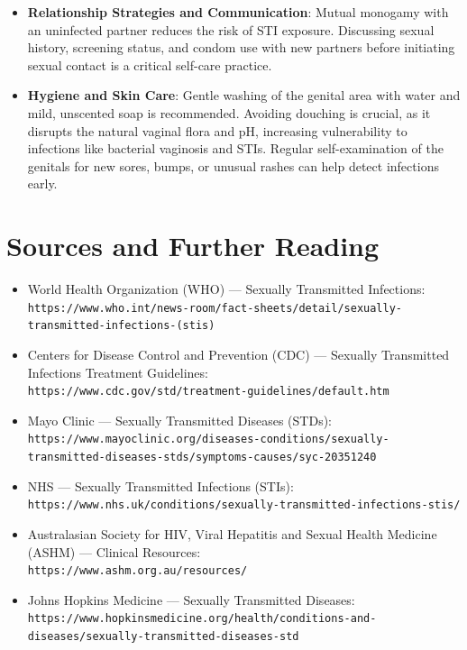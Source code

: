 \begin{itemize}
\begin{itemize}
        \item \textbf{Post-Exposure Prophylaxis (PEP)}: A 28-day course of antiretroviral medications started within 72 hours of a potential high-risk exposure to HIV to prevent infection.
    \end{itemize}
    \item \textbf{Relationship Strategies and Communication}: Mutual monogamy with an uninfected partner reduces the risk of STI exposure. Discussing sexual history, screening status, and condom use with new partners before initiating sexual contact is a critical self-care practice.
    \item \textbf{Hygiene and Skin Care}: Gentle washing of the genital area with water and mild, unscented soap is recommended. Avoiding douching is crucial, as it disrupts the natural vaginal flora and pH, increasing vulnerability to infections like bacterial vaginosis and STIs. Regular self-examination of the genitals for new sores, bumps, or unusual rashes can help detect infections early.
\end{itemize}

\section*{Sources and Further Reading}
\begin{itemize}
    \item World Health Organization (WHO) --- Sexually Transmitted Infections: \\ \texttt{https://www.who.int/news-room/fact-sheets/detail/sexually-transmitted-infections-(stis)}
    \item Centers for Disease Control and Prevention (CDC) --- Sexually Transmitted Infections Treatment Guidelines: \\ \texttt{https://www.cdc.gov/std/treatment-guidelines/default.htm}
    \item Mayo Clinic --- Sexually Transmitted Diseases (STDs): \\ \texttt{https://www.mayoclinic.org/diseases-conditions/sexually-transmitted-diseases-stds/symptoms-causes/syc-20351240}
    \item NHS --- Sexually Transmitted Infections (STIs): \\ \texttt{https://www.nhs.uk/conditions/sexually-transmitted-infections-stis/}
    \item Australasian Society for HIV, Viral Hepatitis and Sexual Health Medicine (ASHM) --- Clinical Resources: \\ \texttt{https://www.ashm.org.au/resources/}
    \item Johns Hopkins Medicine --- Sexually Transmitted Diseases: \\ \texttt{https://www.hopkinsmedicine.org/health/conditions-and-diseases/sexually-transmitted-diseases-std}
\end{itemize}